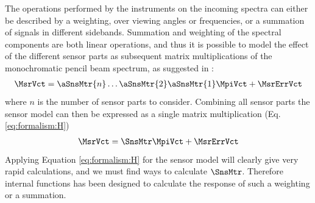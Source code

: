 The operations performed by the instruments on the incoming spectra
can either be described by a weighting, over viewing angles or
frequencies, or a summation of signals in different sidebands.
Summation and weighting of the spectral components are both linear
operations, and thus it is possible to model the effect of the
different sensor parts as subsequent matrix multiplications of the
monochromatic pencil beam spectrum, as suggested in
\citet{eriksson:00a}:
\begin{eqnarray}
  \MsrVct = \aSnsMtr{n}\dots\aSnsMtr{2}\aSnsMtr{1}\MpiVct + \MsrErrVct
\end{eqnarray}
where $n$ is the number of sensor parts to consider. Combining all sensor parts 
the sensor model can then be expressed as a single matrix
multiplication (Eq. \ref{eq:formalism:H})
\begin{eqnarray}
  \MsrVct = \SnsMtr\MpiVct + \MsrErrVct                     \nonumber
\end{eqnarray}
Applying Equation \ref{eq:formalism:H} for the sensor model will
clearly give very rapid calculations, and we must find ways to
calculate $\SnsMtr$. Therefore internal functions has been designed to
calculate the response of such a weighting or a summation.


